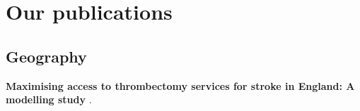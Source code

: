 \section{Our publications}

\subsection{Geography}

\textbf{Maximising access to thrombectomy services for stroke in England: A modelling study} \cite{allen_maximising_2019}.

